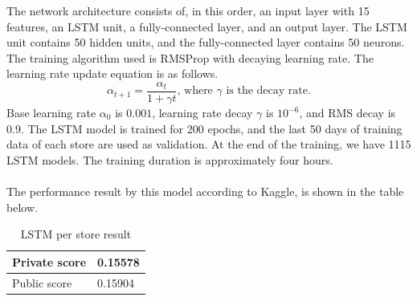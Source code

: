 The network architecture consists of, in this order, an input layer with 15 features, an LSTM unit, a fully-connected layer, and an output layer. The LSTM unit contains 50 hidden units, and the fully-connected layer contains 50 neurons. The training algorithm used is RMSProp with decaying learning rate. The learning rate update equation is as follows.
\begin{equation}
\label{eq:decay_lr}
\alpha_{t+1} = \frac{\alpha_t}{1 + \gamma t} \text{, where } \gamma \text{ is the decay rate.}
\end{equation}
Base learning rate $\alpha_0$ is $0.001$, learning rate decay $\gamma$ is $10^{-6}$, and RMS decay is $0.9$. The LSTM model is trained for 200 epochs, and the last 50 days of training data of each store are used as validation. At the end of the training, we have 1115 LSTM models. The training duration is approximately four hours. \\ \\
The performance result by this model according to Kaggle, is shown in the table below.
\begin{table}[h]
	\centering
	\caption{LSTM per store result}
	\label{tab:lstm_result}
	\begin{tabular}{|m{100pt}|m{50pt}|}
		\hline
		Private score & 0.15578 \\ \hline
		Public score  & 0.15904 \\ \hline
	\end{tabular}
\end{table}
